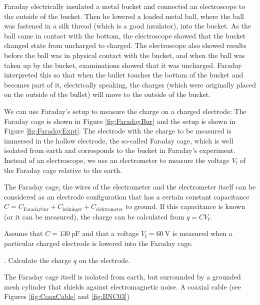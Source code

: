 \documentclass[../Elmag-labhefte-2020.tex]{subfiles}
\begin{document}
Faraday electrically insulated a metal bucket and connected an electroscope to the outside of the bucket. Then he lowered a loaded metal ball, where the ball was fastened in a silk thread (which is a good insulator), into the bucket. As the ball came in contact with the bottom, the electroscope showed that the bucket changed state from uncharged to charged. The electroscope also showed results before the ball was in physical contact with the bucket, and when the ball was taken up by the bucket, examinations showed that it was uncharged. Faraday interpreted this so that when the bullet touches the bottom of the bucket and becomes part of it, electrically speaking, the charges (which were originally placed on the outside of the bullet) will move to the outside of the bucket.

We can use Faraday's setup to measure the charge on a charged electrode: The Faraday cage is shown in Figure \ref{fig:FaradayBur} and the setup is shown in Figure \ref{fig:FaradayExpt}. The electrode with the charge to be measured is immersed in the hollow electrode, the so-called Faraday cage, which is well isolated from earth and corresponds to the bucket in Faraday's experiment. Instead of an electroscope, we use an electrometer to measure the voltage $V_\text{f}$ of the Faraday cage relative to the earth.


The Faraday cage, the wires of the electrometer and the electrometer itself can be considered as an electrode configuration that has a certain constant capacitance $C = C_\text{Faradaybur} + C_\mathrm{ledninger} + C_\text{elektrometer}$ to ground. If this capacitance is known (or it can be measured), the charge can be calculated from $q = C V_\text{f}$.

Assume that $C = \SI{130}{\pico\farad}$ and that a voltage $V_\text{f} = \SI{60}{\volt}$ is measured when a particular charged electrode is lowered into the Faraday cage.

{. Calculate the charge $q$ on the electrode.}

The Faraday cage itself is isolated from earth, but surrounded by a grounded mesh cylinder that shields against electromagnetic noise. A coaxial cable (see Figures \ref{fig:CoaxCable} and \ref{fig:BNC03})
\end{document}
